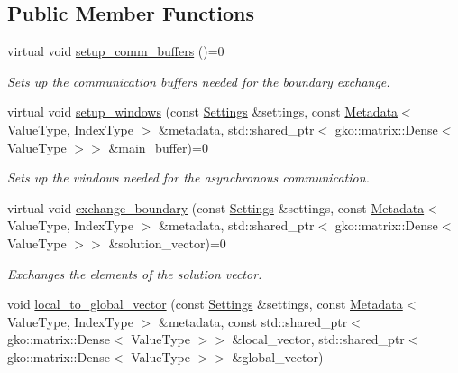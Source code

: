 \subsection*{Public Member Functions}
\begin{DoxyCompactItemize}
\item 
\mbox{\label{classSchwarzWrappers_1_1Communicate_aea258f883ecab5bc4b6f7cd462b5ff4a}} 
virtual void \hyperlink{classSchwarzWrappers_1_1Communicate_aea258f883ecab5bc4b6f7cd462b5ff4a}{setup\+\_\+comm\+\_\+buffers} ()=0
\begin{DoxyCompactList}\small\item\em Sets up the communication buffers needed for the boundary exchange. \end{DoxyCompactList}\item 
virtual void \hyperlink{classSchwarzWrappers_1_1Communicate_ac8849873c56a267f576f7b9ad559de1b}{setup\+\_\+windows} (const \hyperlink{structSchwarzWrappers_1_1Settings}{Settings} \&settings, const \hyperlink{structSchwarzWrappers_1_1Metadata}{Metadata}$<$ Value\+Type, Index\+Type $>$ \&metadata, std\+::shared\+\_\+ptr$<$ gko\+::matrix\+::\+Dense$<$ Value\+Type $>$$>$ \&main\+\_\+buffer)=0
\begin{DoxyCompactList}\small\item\em Sets up the windows needed for the asynchronous communication. \end{DoxyCompactList}\item 
virtual void \hyperlink{classSchwarzWrappers_1_1Communicate_af6ef7b0a4d98427c8c0ea4f4244b08d1}{exchange\+\_\+boundary} (const \hyperlink{structSchwarzWrappers_1_1Settings}{Settings} \&settings, const \hyperlink{structSchwarzWrappers_1_1Metadata}{Metadata}$<$ Value\+Type, Index\+Type $>$ \&metadata, std\+::shared\+\_\+ptr$<$ gko\+::matrix\+::\+Dense$<$ Value\+Type $>$$>$ \&solution\+\_\+vector)=0
\begin{DoxyCompactList}\small\item\em Exchanges the elements of the solution vector. \end{DoxyCompactList}\item 
void \hyperlink{classSchwarzWrappers_1_1Communicate_a8cbe3f4614d10c29fb0570aae8d06213}{local\+\_\+to\+\_\+global\+\_\+vector} (const \hyperlink{structSchwarzWrappers_1_1Settings}{Settings} \&settings, const \hyperlink{structSchwarzWrappers_1_1Metadata}{Metadata}$<$ Value\+Type, Index\+Type $>$ \&metadata, const std\+::shared\+\_\+ptr$<$ gko\+::matrix\+::\+Dense$<$ Value\+Type $>$$>$ \&local\+\_\+vector, std\+::shared\+\_\+ptr$<$ gko\+::matrix\+::\+Dense$<$ Value\+Type $>$$>$ \&global\+\_\+vector)

\end{DoxyCompactItemize}

